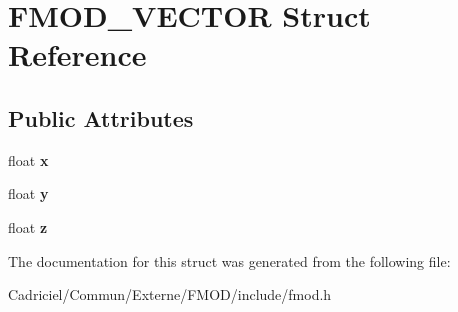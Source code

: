 \hypertarget{struct_f_m_o_d___v_e_c_t_o_r}{}\section{F\+M\+O\+D\+\_\+\+V\+E\+C\+T\+OR Struct Reference}
\label{struct_f_m_o_d___v_e_c_t_o_r}
\subsection*{Public Attributes}
\begin{DoxyCompactItemize}
\item 
float {\bfseries x}\hypertarget{struct_f_m_o_d___v_e_c_t_o_r_afe9fad8ce812c3cfc021c25bbb8bc0e8}{}\label{struct_f_m_o_d___v_e_c_t_o_r_afe9fad8ce812c3cfc021c25bbb8bc0e8}

\item 
float {\bfseries y}\hypertarget{struct_f_m_o_d___v_e_c_t_o_r_abea7feb26ece298baa766f821b8686ff}{}\label{struct_f_m_o_d___v_e_c_t_o_r_abea7feb26ece298baa766f821b8686ff}

\item 
float {\bfseries z}\hypertarget{struct_f_m_o_d___v_e_c_t_o_r_ab64088b1bd2e695bd1abc6b370b71796}{}\label{struct_f_m_o_d___v_e_c_t_o_r_ab64088b1bd2e695bd1abc6b370b71796}

\end{DoxyCompactItemize}


The documentation for this struct was generated from the following file\+:\begin{DoxyCompactItemize}
\item 
Cadriciel/\+Commun/\+Externe/\+F\+M\+O\+D/include/fmod.\+h\end{DoxyCompactItemize}
